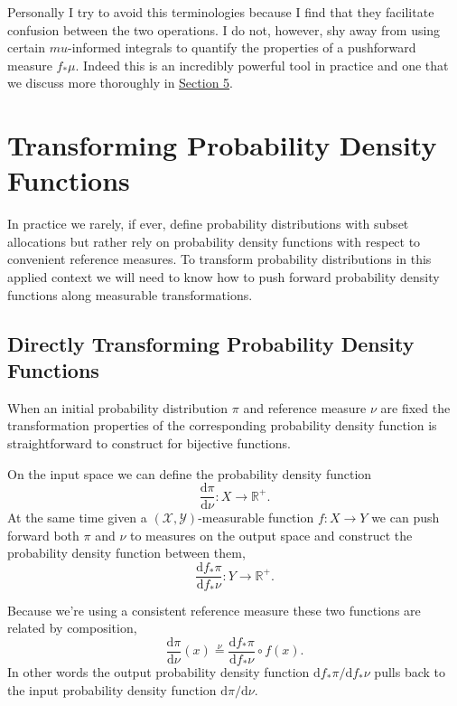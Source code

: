 \documentclass[
  letterpaper,
  DIV=11,
  numbers=noendperiod]{scrartcl}
\begin{document}
Personally I try to avoid this terminologies because I find that they
facilitate confusion between the two operations. I do not, however, shy
away from using certain \(mu\)-informed integrals to quantify the
properties of a pushforward measure \(f_{*} \mu\). Indeed this is an
incredibly powerful tool in practice and one that we discuss more
thoroughly in \href{@sec:1d-pushforward-characterizations}{Section 5}.

\hypertarget{transforming-probability-density-functions}{%
\section{Transforming Probability Density
Functions}\label{transforming-probability-density-functions}}

In practice we rarely, if ever, define probability distributions with
subset allocations but rather rely on probability density functions with
respect to convenient reference measures. To transform probability
distributions in this applied context we will need to know how to push
forward probability density functions along measurable transformations.

\hypertarget{directly-transforming-probability-density-functions}{%
\subsection{Directly Transforming Probability Density
Functions}\label{directly-transforming-probability-density-functions}}

When an initial probability distribution \(\pi\) and reference measure
\(\nu\) are fixed the transformation properties of the corresponding
probability density function is straightforward to construct for
bijective functions.

On the input space we can define the probability density function \[
\frac{ \mathrm{d} \pi }{ \mathrm{d} \nu} : X \rightarrow \mathbb{R}^{+}.
\] At the same time given a \((\mathcal{X}, \mathcal{Y})\)-measurable
function \(f : X \rightarrow Y\) we can push forward both \(\pi\) and
\(\nu\) to measures on the output space and construct the probability
density function between them, \[
\frac{ \mathrm{d} f_{*} \pi }{ \mathrm{d} f_{*} \nu} :
Y \rightarrow \mathbb{R}^{+}.
\]

Because we're using a consistent reference measure these two functions
are related by composition, \[
\frac{ \mathrm{d} \pi }{ \mathrm{d} \nu}(x)
\overset{\nu}{=}
\frac{ \mathrm{d} f_{*} \pi }{ \mathrm{d} f_{*} \nu} \circ f(x).
\] In other words the output probability density function
\(\mathrm{d} f_{*} \pi / \mathrm{d} f_{*} \nu\) pulls back to the input
probability density function \(\mathrm{d} \pi / \mathrm{d} \nu\).
\end{document}
